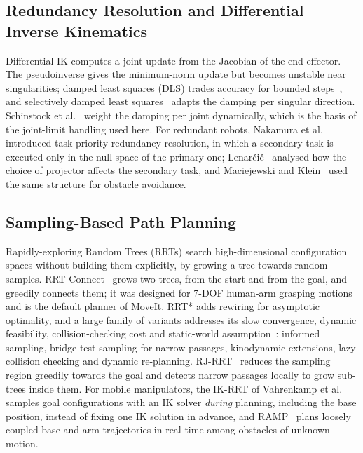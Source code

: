 \documentclass[12pt,a4paper]{article}
\begin{document}
\subsection{Redundancy Resolution and Differential Inverse Kinematics}

Differential IK computes a joint update from the Jacobian of the end effector. The pseudoinverse
gives the minimum-norm update but becomes unstable near singularities; damped least squares
(DLS) trades accuracy for bounded steps~\cite{buss2009}, and selectively damped least
squares~\cite{bussKim2004} adapts the damping per singular direction. Schinstock et
al.~\cite{schinstock1994} weight the damping per joint dynamically, which is the basis of the
joint-limit handling used here. For redundant robots, Nakamura et al.~\cite{nakamura1987}
introduced task-priority redundancy resolution, in which a secondary task is executed only in
the null space of the primary one; Lenar\v{c}i\v{c}~\cite{lenarcic1998} analysed how the choice
of projector affects the secondary task, and Maciejewski and Klein~\cite{maciejewski1985} used the
same structure for obstacle avoidance.

\subsection{Sampling-Based Path Planning}

Rapidly-exploring Random Trees (RRTs) search high-dimensional configuration spaces without
building them explicitly, by growing a tree towards random samples. RRT-Connect~\cite{kuffner2000}
grows two trees, from the start and from the goal, and greedily connects them; it was designed for
7-DOF human-arm grasping motions and is the default planner of MoveIt. RRT*
adds rewiring for asymptotic optimality, and a large family of variants addresses its slow
convergence, dynamic feasibility, collision-checking cost and static-world
assumption~\cite{hameed2025}: informed sampling, bridge-test sampling for narrow passages,
kinodynamic extensions, lazy collision checking and dynamic re-planning. RJ-RRT~\cite{chai2022}
reduces the sampling region greedily towards the goal and detects narrow passages locally to grow
sub-trees inside them. For mobile manipulators, the IK-RRT of Vahrenkamp et
al.~\cite{vahrenkamp2010} samples goal configurations with an IK solver \emph{during} planning,
including the base position, instead of fixing one IK solution in advance, and RAMP~\cite{vannoy2008}
plans loosely coupled base and arm trajectories in real time among obstacles of unknown motion.
\end{document}

